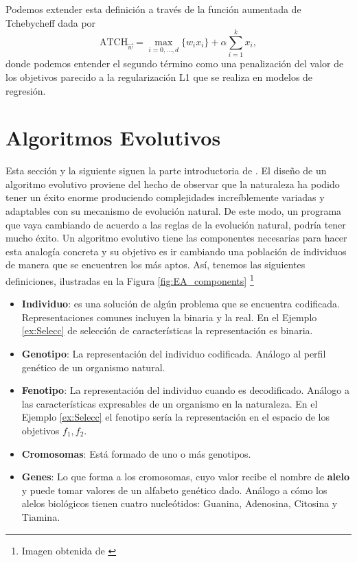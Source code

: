 Podemos extender esta definición a través de la función aumentada de Tchebycheff dada por
\begin{equation} \label{eq:tchebychev}
    \text{ATCH}_{\vec{w}}=\max_{i=0,\ldots,d} \{w_ix_i\}+\alpha \sum_{i=1}^k x_i   ,
\end{equation}
donde podemos entender el segundo término como una penalización del valor de los objetivos parecido a la regularización L1 que se realiza en modelos de regresión.





\section{Algoritmos Evolutivos} \label{sec:AE}

Esta sección y la siguiente siguen la parte introductoria de \cite{EAforMOEAs}. El diseño de un algoritmo evolutivo proviene del hecho de observar  que la naturaleza ha podido tener un éxito enorme produciendo complejidades increíblemente variadas y adaptables con su mecanismo de evolución natural. De este modo, un programa que vaya cambiando de acuerdo a las reglas de la evolución natural, podría tener mucho éxito. Un algoritmo evolutivo tiene las componentes necesarias para hacer esta analogía concreta y su objetivo es ir cambiando una población de individuos de manera que se encuentren los más aptos. Así, tenemos las siguientes definiciones, ilustradas en la Figura \ref{fig:EA_components} \footnote{Imagen obtenida  de \cite{coelloEvolutionaryAlgorithmsSolving}}

\begin{itemize}
    \item \textbf{Individuo}: es una solución de algún problema que se encuentra codificada. Representaciones comunes incluyen la binaria y la real. En el Ejemplo \ref{ex:Selecc} de selección de características  la representación es binaria.
    \item \textbf{Genotipo}: La representación del individuo codificada. Análogo al perfil genético de un organismo natural. 
    \item \textbf{Fenotipo}: La representación del individuo cuando es decodificado. Análogo a las características expresables de un organismo en la naturaleza. En el Ejemplo \ref{ex:Selecc} el fenotipo sería la representación en el espacio de los objetivos $f_1, f_2$.
    \item \textbf{Cromosomas}: Está formado de uno o más genotipos.
    \item \textbf{Genes}: Lo que forma a los cromosomas, cuyo valor recibe el nombre de \textbf{alelo} y puede tomar valores de un alfabeto genético dado. Análogo a cómo los alelos biológicos tienen cuatro nucleótidos: Guanina, Adenosina, Citosina y Tiamina. 
\end{itemize}

